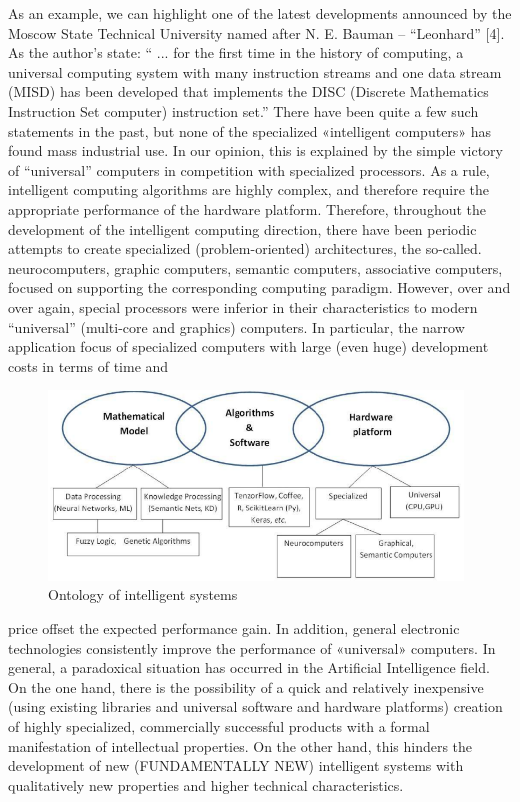 \documentclass[10pt]{article}
\begin{document}
{\begin{multicols*}{2}
\vspace{10pt}
As an example, we can highlight one of the latest
developments announced by the Moscow State Technical
University named after N. E. Bauman – “Leonhard” [4].
As the author’s state: “ ... for the first time in the history
of computing, a universal computing system with many
instruction streams and one data stream (MISD) has been
developed that implements the DISC (Discrete Mathematics Instruction Set computer) instruction set.” There
have been quite a few such statements in the past, but
none of the specialized «intelligent computers» has found
mass industrial use. In our opinion, this is explained by
the simple victory of “universal” computers in competition with specialized processors. As a rule, intelligent
computing algorithms are highly complex, and therefore
require the appropriate performance of the hardware
platform. Therefore, throughout the development of the
intelligent computing direction, there have been periodic
attempts to create specialized (problem-oriented) architectures, the so-called. neurocomputers, graphic computers, semantic computers, associative computers, focused
on supporting the corresponding computing paradigm.
However, over and over again, special processors were
inferior in their characteristics to modern “universal”
(multi-core and graphics) computers. In particular, the
narrow application focus of specialized computers with
large (even huge) development costs in terms of time and
\end{multicols*}
\begin{figure}
    \centering
    \includegraphics[width=0.98\textwidth]{ontology.png}
    \caption{Ontology of intelligent systems}
\end{figure}
\begin{multicols*}{2}
\noindent price offset the expected performance gain. In addition,
general electronic technologies consistently improve the
performance of «universal» computers. In general, a
paradoxical situation has occurred in the Artificial Intelligence field. On the one hand, there is the possibility of a
quick and relatively inexpensive (using existing libraries
and universal software and hardware platforms) creation
of highly specialized, commercially successful products
with a formal manifestation of intellectual properties.
On the other hand, this hinders the development of
new (FUNDAMENTALLY NEW) intelligent systems
with qualitatively new properties and higher technical
characteristics.


\end{multicols*}}
\end{document}
